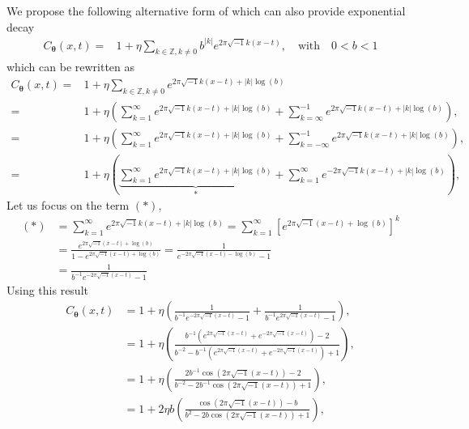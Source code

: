 \documentclass{iitthesis}          %
\newcommand{\bm}[1]{\boldsymbol{#1}}
\newcommand{\vtheta}{{\bm{\theta}}}
\def\abs#1{\ensuremath{\left \lvert #1 \right \rvert}}
\begin{document}
We propose the following alternative form of which can also provide exponential decay
\begin{align*}
C_\vtheta(x, t) = & 1 + \eta \sum_{k \in \mathbb{Z}, k \neq 0 } b^{\abs{k}}  
e^{ 2 \pi\sqrt{-1} k (x-t)}, \quad \text{with} \quad 0 < b < 1
\end{align*}
which can be rewritten as
\begin{align*}
C_\vtheta(x, t) = & 1 + \eta \sum_{k \in \mathbb{Z}, k \neq 0 } 
e^{ 2 \pi\sqrt{-1} k (x-t) + \abs{k} \log(b)}
\\
=& 1 + \eta 
\left(
\sum_{k=1}^\infty e^{ 2 \pi\sqrt{-1} k (x-t) + \abs{k} \log(b)} 
+
\sum_{k=\infty}^{-1} e^{ 2 \pi\sqrt{-1} k (x-t) + \abs{k} \log(b)}
\right), 
\\
=& 1 + \eta 
\left(
\sum_{k=1}^\infty e^{ 2 \pi\sqrt{-1} k (x-t) + \abs{k} \log(b)} 
+
\sum_{k=-\infty}^{-1} e^{ 2 \pi\sqrt{-1} k (x-t) + \abs{k} \log(b)}
\right), 
\\
=& 1 + \eta 
\left(
\underbrace{
	\sum_{k=1}^\infty e^{ 2 \pi\sqrt{-1} k (x-t) + \abs{k} \log(b)} }_{*}
+
\sum_{k=1}^{\infty} e^{ -2 \pi\sqrt{-1} k (x-t) + \abs{k} \log(b)}
\right), 
\end{align*}
Let us focus on the term $(*)$,
\begin{align*}
(*) & = \sum_{k=1}^\infty e^{ 2 \pi\sqrt{-1} k (x-t) + \abs{k} \log(b)} =
\sum_{k=1}^\infty \left[e^{ 2 \pi\sqrt{-1} (x-t) +  \log(b)} \right]^k
\\
& = \frac{e^{ 2 \pi\sqrt{-1} (x-t) +  \log(b)}}{1- e^{ 2 \pi\sqrt{-1} (x-t) +  \log(b)}}
= \frac{1}{ e^{- 2 \pi\sqrt{-1} (x-t) -  \log(b)} -1 }
\\
& =\frac{1}{ b^{-1} e^{- 2 \pi\sqrt{-1} (x-t)} -1 }
\end{align*}
Using this result
\begin{align*}
C_\vtheta(x, t) &= 
1 + \eta 
\left(
\frac{1}{ b^{-1} e^{- 2 \pi\sqrt{-1} (x-t)} -1 }
+
\frac{1}{ b^{-1} e^{ 2 \pi\sqrt{-1} (x-t)} -1 }
\right),
\\
&= 
1 + \eta 
\left(
\frac{b^{-1} \left(e^{2 \pi\sqrt{-1} (x-t) }+ e^{ -2 \pi\sqrt{-1} (x-t)}\right) -2 }
{b^{-2} - b^{-1} \left(e^{ 2 \pi\sqrt{-1} (x-t)} + e^{ -2 \pi\sqrt{-1} (x-t)}\right) + 1 }
\right),
\\
&= 
1 + \eta 
\left(
\frac{2 b^{-1} \cos({2 \pi\sqrt{-1} (x-t) }) -2 }
{b^{-2} - 2 b^{-1} \cos({ 2 \pi\sqrt{-1} (x-t)})  + 1 }
\right),
\\
&= 
1 + 2 \eta b
\left(
\frac{ \cos({2 \pi\sqrt{-1} (x-t) }) - b }
{b^{2} - 2 b \cos({ 2 \pi\sqrt{-1} (x-t)})  + 1 }
\right),
\end{align*}
\end{document}
